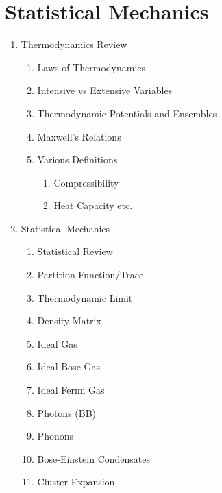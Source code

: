 \documentclass[12pt]{extarticle}
\begin{document}
\section{Statistical Mechanics}
\begin{enumerate}
  \item{Thermodynamics Review}
  \begin{enumerate}
    \item{Laws of Thermodynamics}
    \item{Intensive vs Extensive Variables}
    \item{Thermodynamic Potentials and Ensembles}
    \item{Maxwell's Relations}
    \item{Various Definitions}
    \begin{enumerate}
      \item{Compressibility}
      \item{Heat Capacity etc.}
    \end{enumerate}
  \end{enumerate}
  \item{Statistical Mechanics}
  \begin{enumerate}
    \item{Statistical Review}
    \item{Partition Function/Trace}
    \item{Thermodynamic Limit}
    \item{Density Matrix}
    \item{Ideal Gas}
    \item{Ideal Bose Gas}
    \item{Ideal Fermi Gas}
    \item{Photons (BB)}
    \item{Phonons}
    \item{Bose-Einstein Condensates}
    \item{Cluster Expansion}
  \end{enumerate}
\end{enumerate}
\end{document}
